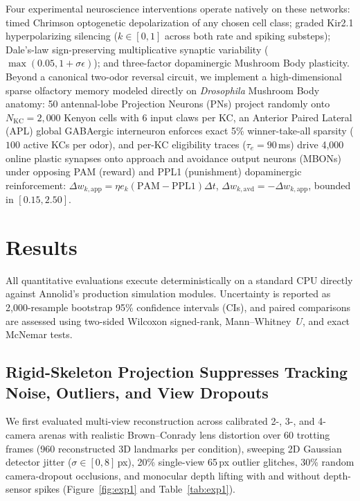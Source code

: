 \documentclass[10pt,twocolumn,letterpaper]{article}
\begin{document}
Four experimental neuroscience interventions operate natively on these networks: timed Chrimson optogenetic depolarization of any chosen cell class; graded Kir2.1 hyperpolarizing silencing ($k \in [0,1]$ across both rate and spiking substeps); Dale's-law sign-preserving multiplicative synaptic variability ($\max(0.05, 1+\sigma\epsilon)$); and three-factor dopaminergic Mushroom Body plasticity. Beyond a canonical two-odor reversal circuit, we implement a high-dimensional sparse olfactory memory modeled directly on \emph{Drosophila} Mushroom Body anatomy: 50 antennal-lobe Projection Neurons (PNs) project randomly onto $N_{\mathrm{KC}} = 2{,}000$ Kenyon cells with 6 input claws per KC, an Anterior Paired Lateral (APL) global GABAergic interneuron enforces exact 5\% winner-take-all sparsity ($100$ active KCs per odor), and per-KC eligibility traces ($\tau_e = 90$\,ms) drive 4,000 online plastic synapses onto approach and avoidance output neurons (MBONs) under opposing PAM (reward) and PPL1 (punishment) dopaminergic reinforcement: $\Delta w_{k,\mathrm{app}} = \eta e_k (\mathrm{PAM}-\mathrm{PPL1})\Delta t$, $\Delta w_{k,\mathrm{avd}} = -\Delta w_{k,\mathrm{app}}$, bounded in $[0.15, 2.50]$.

\section{Results}

All quantitative evaluations execute deterministically on a standard CPU directly against Annolid's production simulation modules. Uncertainty is reported as 2,000-resample bootstrap 95\% confidence intervals (CIs), and paired comparisons are assessed using two-sided Wilcoxon signed-rank, Mann--Whitney~$U$, and exact McNemar tests.

\subsection{Rigid-Skeleton Projection Suppresses Tracking Noise, Outliers, and View Dropouts}

We first evaluated multi-view reconstruction across calibrated 2-, 3-, and 4-camera arenas with realistic Brown--Conrady lens distortion over 60 trotting frames (960 reconstructed 3D landmarks per condition), sweeping 2D Gaussian detector jitter ($\sigma \in [0, 8]$\,px), 20\% single-view 65\,px outlier glitches, 30\% random camera-dropout occlusions, and monocular depth lifting with and without depth-sensor spikes (Figure~\ref{fig:exp1} and Table~\ref{tab:exp1}).
\end{document}
